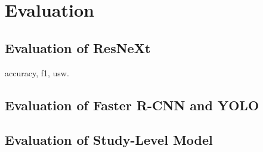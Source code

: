 \chapter{Evaluation}\label{chapter:evaluation}


\section{Evaluation of ResNeXt} \label{chapter:eval_resnext}

accuracy, f1, usw.

\section{Evaluation of Faster R-CNN and YOLO}\label{chapter:eval_rcnn_yolo}


\section{Evaluation of Study-Level Model}
